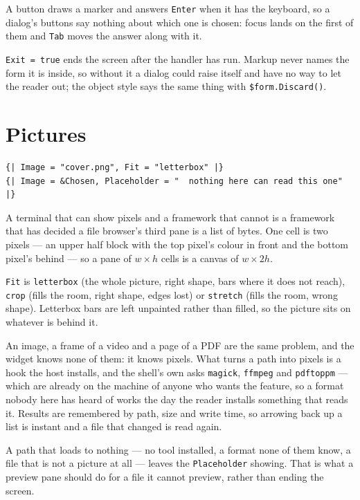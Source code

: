 \documentclass[11pt,a4paper,twoside,openany]{book}
\newcommand{\code}[1]{\texttt{\small #1}}
\begin{document}
A button draws a marker and answers \code{Enter} when it has the keyboard, so a
dialog's buttons say nothing about which one is chosen: focus lands on the first
of them and \code{Tab} moves the answer along with it.

\code{Exit = true} ends the screen after the handler has run. Markup never names
the form it is inside, so without it a dialog could raise itself and have no way
to let the reader out; the object style says the same thing with
\code{\$form.Discard()}.

\section{Pictures}
\label{sec:pictures}

\begin{lstlisting}
{| Image = "cover.png", Fit = "letterbox" |}
{| Image = &Chosen, Placeholder = "  nothing here can read this one" |}
\end{lstlisting}

A terminal that can show pixels and a framework that cannot is a framework that has
decided a file browser's third pane is a list of bytes. One cell is two pixels ---
an upper half block with the top pixel's colour in front and the bottom pixel's
behind --- so a pane of $w \times h$ cells is a canvas of $w \times 2h$.

\code{Fit} is \code{letterbox} (the whole picture, right shape, bars where it does
not reach), \code{crop} (fills the room, right shape, edges lost) or \code{stretch}
(fills the room, wrong shape). Letterbox bars are left unpainted rather than
filled, so the picture sits on whatever is behind it.

An image, a frame of a video and a page of a PDF are the same problem, and the
widget knows none of them: it knows pixels. What turns a path into pixels is a hook
the host installs, and the shell's own asks \code{magick}, \code{ffmpeg} and
\code{pdftoppm} --- which are already on the machine of anyone who wants the
feature, so a format nobody here has heard of works the day the reader installs
something that reads it. Results are remembered by path, size and write time, so
arrowing back up a list is instant and a file that changed is read again.

\begin{tipbox}
A path that loads to nothing --- no tool installed, a format none of them know, a
file that is not a picture at all --- leaves the \code{Placeholder} showing. That is
what a preview pane should do for a file it cannot preview, rather than ending the
screen.
\end{tipbox}
\end{document}
